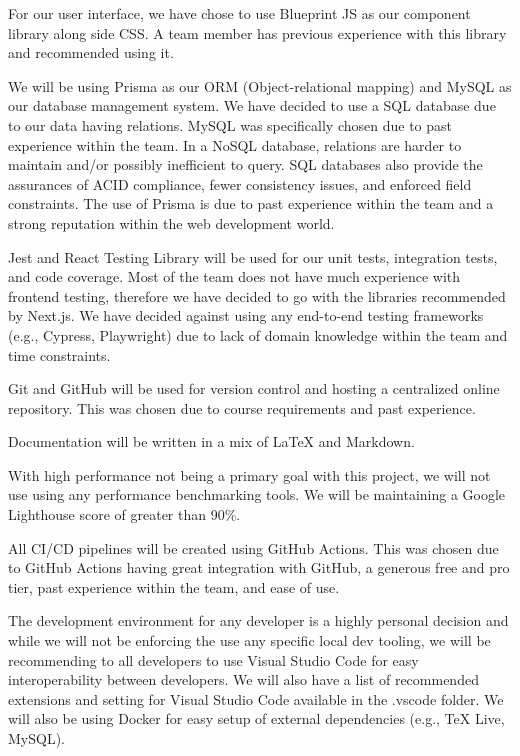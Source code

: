 \documentclass{article}
\begin{document}
For our user interface, we have chose to use Blueprint JS as our component library along side CSS. A
team member has previous experience with this library and recommended using it.

We will be using Prisma as our ORM (Object-relational mapping) and MySQL as our database management
system. We have decided to use a SQL database due to our data having relations. MySQL was
specifically chosen due to past experience within the team. In a NoSQL database, relations are
harder to maintain and/or possibly inefficient to query. SQL databases also provide the assurances
of ACID compliance, fewer consistency issues, and enforced field constraints. The use of Prisma is
due to past experience within the team and a strong reputation within the web development world.

Jest and React Testing Library will be used for our unit tests, integration tests, and code
coverage. Most of the team does not have much experience with frontend testing, therefore we have
decided to go with the libraries recommended by Next.js. We have decided against using any
end-to-end testing frameworks (e.g., Cypress, Playwright) due to lack of domain knowledge within the
team and time constraints.

Git and GitHub will be used for version control and hosting a centralized online repository. This
was chosen due to course requirements and past experience.

Documentation will be written in a mix of \LaTeX{} and Markdown.

With high performance not being a primary goal with this project, we will not use using any
performance benchmarking tools. We will be maintaining a Google Lighthouse score of greater than
90\%.

All CI/CD pipelines will be created using GitHub Actions. This was chosen due to GitHub Actions
having great integration with GitHub, a generous free and pro tier, past experience within the team,
and ease of use.

The development environment for any developer is a highly personal decision and while we will not be
enforcing the use any specific local dev tooling, we will be recommending to all developers to use
Visual Studio Code for easy interoperability between developers. We will also have a list of
recommended extensions and setting for Visual Studio Code available in the .vscode folder. We will
also be using Docker for easy setup of external dependencies (e.g., TeX Live, MySQL).
\end{document}
